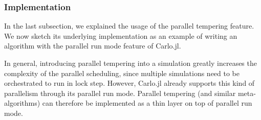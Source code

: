 \documentclass{SciPost}
\begin{document}
\subsubsection{Implementation}
In the last subsection, we explained the usage of the parallel tempering feature. We now sketch its underlying implementation as an example of writing an algorithm with the parallel run mode feature of Carlo.jl.

In general, introducing parallel tempering into a simulation greatly increases the complexity of the parallel scheduling, since multiple simulations need to be orchestrated to run in lock step. However, Carlo.jl already supports this kind of parallelism through its parallel run mode. Parallel tempering (and similar meta-algorithms) can therefore be implemented as a thin layer on top of parallel run mode. 
\end{document}
